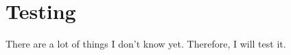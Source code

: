 
\chapter{Testing}
\label{ch:testing}
There are a lot of things I don't know yet. Therefore, I will test it. 
\cite{OpenAI}